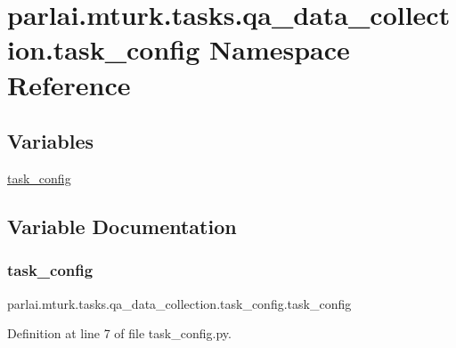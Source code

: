 \hypertarget{namespaceparlai_1_1mturk_1_1tasks_1_1qa__data__collection_1_1task__config}{}\section{parlai.\+mturk.\+tasks.\+qa\+\_\+data\+\_\+collection.\+task\+\_\+config Namespace Reference}
\label{namespaceparlai_1_1mturk_1_1tasks_1_1qa__data__collection_1_1task__config}
\subsection*{Variables}
\begin{DoxyCompactItemize}
\item 
\hyperlink{namespaceparlai_1_1mturk_1_1tasks_1_1qa__data__collection_1_1task__config_a64b1644ceb3726f33dbabbf7bb27bf8b}{task\+\_\+config}
\end{DoxyCompactItemize}


\subsection{Variable Documentation}
\mbox{\label{namespaceparlai_1_1mturk_1_1tasks_1_1qa__data__collection_1_1task__config_a64b1644ceb3726f33dbabbf7bb27bf8b}} 
\subsubsection{\texorpdfstring{task\+\_\+config}{task\_config}}
{\footnotesize\ttfamily parlai.\+mturk.\+tasks.\+qa\+\_\+data\+\_\+collection.\+task\+\_\+config.\+task\+\_\+config}



Definition at line 7 of file task\+\_\+config.\+py.

